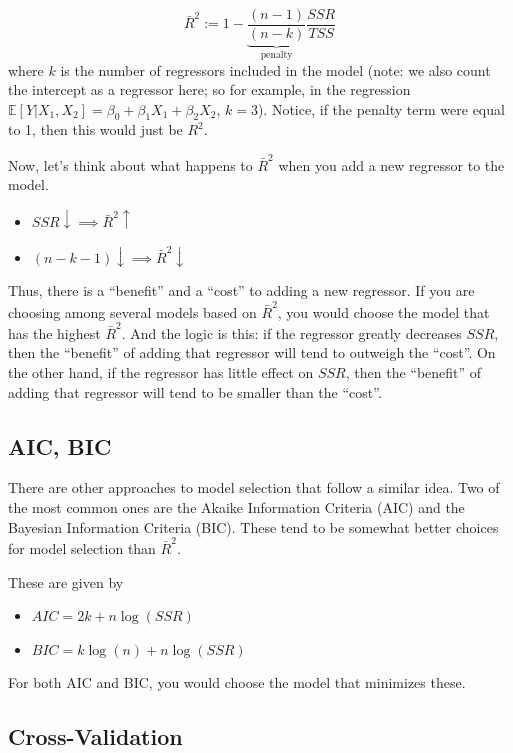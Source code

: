 \documentclass[
  letterpaper,
  DIV=11,
  numbers=noendperiod]{scrreprt}
\providecommand{\tightlist}{%
  \setlength{\itemsep}{0pt}\setlength{\parskip}{0pt}}\usepackage{longtable,booktabs,array}
\begin{document}
\[
  \bar{R}^2 := 1 - \underbrace{\frac{(n-1)}{(n-k)}}_{\textrm{penalty}} \frac{SSR}{TSS}
\] where \(k\) is the number of regressors included in the model (note:
we also count the intercept as a regressor here; so for example, in the
regression
\(\mathbb{E}[Y|X_1,X_2] = \beta_0 + \beta_1 X_1 + \beta_2 X_2\),
\(k=3\)). Notice, if the penalty term were equal to 1, then this would
just be \(R^2\).

Now, let's think about what happens to \(\bar{R}^2\) when you add a new
regressor to the model.

\begin{itemize}
\item
  \(SSR \downarrow \implies \bar{R}^2 \uparrow\)
\item
  \((n-k-1) \downarrow \implies \bar{R}^2 \downarrow\)
\end{itemize}

Thus, there is a ``benefit'' and a ``cost'' to adding a new regressor.
If you are choosing among several models based on \(\bar{R}^2\), you
would choose the model that has the highest \(\bar{R}^2\). And the logic
is this: if the regressor greatly decreases \(SSR\), then the
``benefit'' of adding that regressor will tend to outweigh the ``cost''.
On the other hand, if the regressor has little effect on \(SSR\), then
the ``benefit'' of adding that regressor will tend to be smaller than
the ``cost''.

\subsection{AIC, BIC}\label{aic-bic}

There are other approaches to model selection that follow a similar
idea. Two of the most common ones are the Akaike Information Criteria
(AIC) and the Bayesian Information Criteria (BIC). These tend to be
somewhat better choices for model selection than \(\bar{R}^2\).

These are given by

\begin{itemize}
\tightlist
\item
  \(AIC = 2k + n \log(SSR)\)
\item
  \(BIC = k \log(n) + n \log(SSR)\)
\end{itemize}

For both AIC and BIC, you would choose the model that minimizes these.

\subsection{Cross-Validation}\label{cross-validation}
\end{document}
